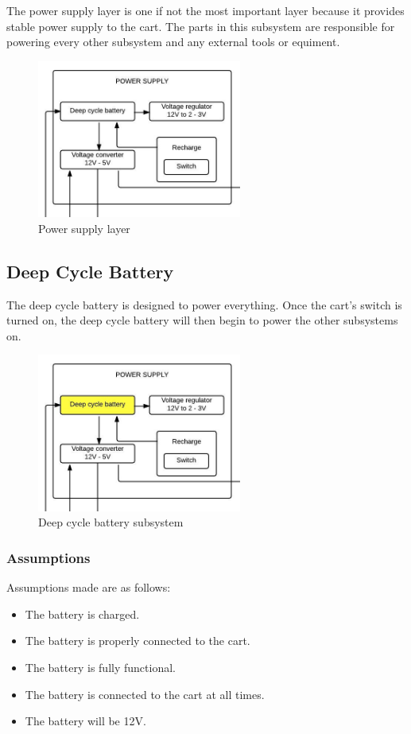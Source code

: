 The power supply layer is one if not the most important layer because it provides stable power supply to the cart. The parts in this subsystem are responsible for powering every other subsystem and any external tools or equiment. 

\begin{figure}[h!]
	\centering
 	\includegraphics[width=0.60\textwidth]{images/power_supply}
 \caption{Power supply layer}
\end{figure}

\subsection{Deep Cycle Battery}
The deep cycle battery is designed to power everything. Once the cart's switch is turned on, the deep cycle battery will then begin to power the other subsystems on.

\begin{figure}[h!]
	\centering
 	\includegraphics[width=0.60\textwidth]{images/power_supply_batt}
 \caption{Deep cycle battery subsystem}
\end{figure}

\subsubsection{Assumptions}
Assumptions made are as follows:
\begin{itemize}
	\item The battery is charged.
	\item The battery is properly connected to the cart.
	\item The battery is fully functional.
	\item The battery is connected to the cart at all times.
	\item The battery will be 12V.
\end{itemize}

